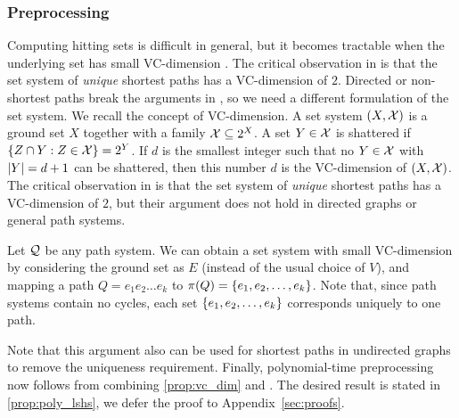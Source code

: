 \documentclass[opre,nonblindrev]{informs3} %
\begin{document}
\subsubsection{Preprocessing}
\label{sec:preproc}
Computing hitting sets is difficult in general, but it becomes tractable when the underlying set has small VC-dimension \cite{vc_dim_hitting}.
The critical observation in \cite{highway2013} is that the set system of \emph{unique} shortest paths has a VC-dimension of $2$.
Directed or non-shortest paths break the arguments in \cite{highway2013}, so we need a different formulation of the set system.
We recall the concept of VC-dimension.
A set system $(X,\mathcal{X})$ is a ground set $X$ together with a family $\mathcal{X}\subseteq 2^X$.
A set $Y\in \mathcal{X}$ is shattered if $\{Z\cap Y:Z\in\mathcal{X}\}=2^Y$.
If $d$ is the smallest integer such that no $Y\in\mathcal{X}$ with $\lvert Y\rvert=d+1$ can be shattered, then this number $d$ is the VC-dimension of $(X,\mathcal{X})$.
The critical observation in \cite{highway2013} is that the set system of \emph{unique} shortest paths has a VC-dimension of $2$, but their argument does not hold in directed graphs or general path systems.

Let $\mathcal{Q}$ be any path system.
We can obtain a set system with small VC-dimension by considering the ground set as $E$ (instead of the usual choice of $V$), and mapping a path $Q=e_1e_2\ldots e_k$ to $\pi(Q)=\{e_1,e_2,\ldots,e_k\}$.
Note that, since path systems contain no cycles, each set $\{e_1,e_2,\ldots,e_k\}$ corresponds uniquely to one path.
Note that this argument also can be used for shortest paths in undirected graphs to remove the uniqueness requirement.
Finally, polynomial-time preprocessing now follows from combining \cref{prop:vc_dim} and \cite{vc_dim_hitting}.
The desired result is stated in \cref{prop:poly_lshs}, we defer the proof to Appendix~\ref{sec:proofs}.

\end{document}
